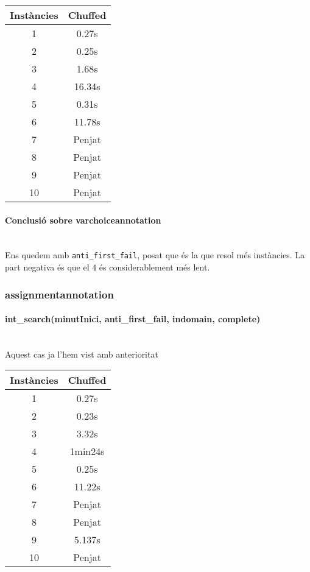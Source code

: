 \documentclass[11pt,a4paper,twoside]{report}
\begin{document}
\begin{tabular}{|c|c|}
    \hline
    Instàncies & Chuffed \\
    \hline
    1 &  0.27s  \\
    2 &  0.25s  \\
    3 &  1.68s  \\
    4 &  16.34s \\
    5 &  0.31s \\
    6 &  11.78s \\
    7 &  Penjat  \\
    8 &  Penjat  \\
    9 &  Penjat \\
    10 & Penjat  \\
    \hline
\end{tabular}



\paragraph*{Conclusió sobre varchoiceannotation} ~\\
Ens quedem amb \texttt{anti\_first\_fail}, posat que és la que resol més instàncies. La part negativa és que el 4 és considerablement més lent.

\subsubsection{assignmentannotation}

\paragraph*{int\_search(minutInici, anti\_first\_fail, indomain, complete)} ~\\
Aquest cas ja l'hem vist amb anterioritat \\
\begin{tabular}{|c|c|}
    \hline
    Instàncies & Chuffed \\
    \hline
    1 & 0.27s \\
    2 & 0.23s \\
    3 & 3.32s  \\
    4 & 1min24s \\
    5 & 0.25s  \\
    6 & 11.22s  \\
    7 & Penjat   \\
    8 & Penjat   \\
    9 & 5.137s \\
    10 & Penjat   \\
    \hline
\end{tabular}
\end{document}
